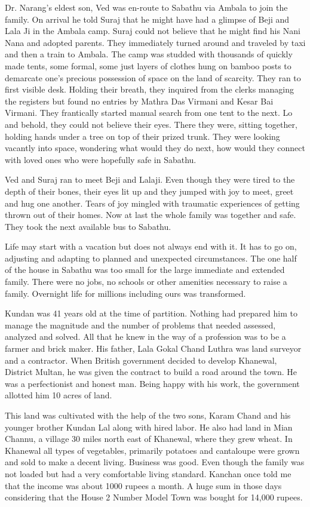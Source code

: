 Dr. Narang's eldest son, Ved was en-route to Sabathu via Ambala to join the family. On arrival he told Suraj that he might have had a glimpse of Beji and Lala Ji in the Ambala  camp. Suraj could not believe that he might find his Nani Nana and adopted parents. They immediately turned around and traveled by taxi and then a train to Ambala. The camp was studded with thousands of quickly made tents, some formal, some just layers of clothes hung on bamboo posts to demarcate one's precious possession of space on the land of scarcity. They ran to first visible desk. Holding their breath, they inquired from the clerks managing the registers but found no entries by Mathra Das Virmani and Kesar Bai Virmani. They frantically started manual search from one tent to the next. Lo and behold, they could not believe their eyes. There they were, sitting together, holding hands under a tree on top of their prized trunk. They were looking vacantly into space, wondering what would they do next, how would they connect with loved ones who were hopefully safe in Sabathu.

Ved and Suraj ran to meet Beji and Lalaji. Even though they were tired to the depth of their bones, their eyes lit up and they jumped with joy to meet, greet and hug one another. Tears of joy mingled with traumatic experiences of getting thrown out of their homes. Now at last the whole family was together and safe. They took the next available bus to Sabathu. 

Life may start with a vacation but does not always end with it. It has to go on, adjusting and adapting to planned and unexpected circumstances. The one half of the house in Sabathu was too small for the large immediate and extended family. There were no jobs, no schools or other amenities necessary to raise a family. Overnight life for millions including ours was transformed. 
        
                 Kundan was 41 years old at the time of partition. Nothing had prepared him to manage the magnitude and the number of problems that needed assessed, analyzed and solved. All that he knew in the way of a profession was to be a farmer and brick maker. His father, Lala Gokal Chand Luthra was land surveyor and a contractor. When British government decided to develop Khanewal, District Multan, he was given the contract to build a road around the town. He was a perfectionist and honest man. Being happy with his work, the government allotted him 10 acres of land. 

This land was cultivated with the help of the two sons, Karam Chand and his younger brother Kundan Lal along with hired labor. He also had land in Mian Channu, a village 30 miles north east of Khanewal, where they grew wheat. In Khanewal all types of vegetables, primarily potatoes and cantaloupe were grown and sold to make a decent living. Business was good. Even though the family was not loaded but had a very comfortable living standard. Kanchan once told me that the income was about 1000 rupees a month. A huge sum in those days considering that the House 2 Number Model Town was bought for 14,000 rupees. 

